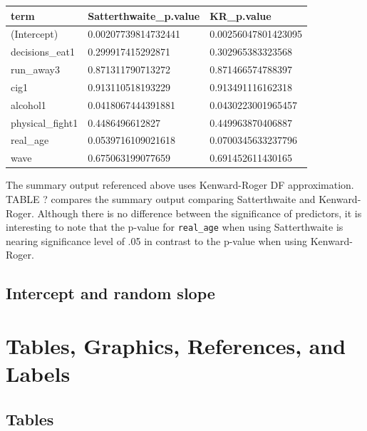 \documentclass[12pt, twoside]{amherstthesis}
\begin{document}
\begin{tabular}{l|l|l}
\hline
term & Satterthwaite\_p.value & KR\_p.value\\
\hline
(Intercept) & 0.00207739814732441 & 0.00256047801423095\\
\hline
decisions\_eat1 & 0.299917415292871 & 0.302965383323568\\
\hline
run\_away3 & 0.871311790713272 & 0.871466574788397\\
\hline
cig1 & 0.913110518193229 & 0.913491116162318\\
\hline
alcohol1 & 0.0418067444391881 & 0.0430223001965457\\
\hline
physical\_fight1 & 0.4486496612827 & 0.449963870406887\\
\hline
real\_age & 0.0539716109021618 & 0.0700345633237796\\
\hline
wave & 0.675063199077659 & 0.691452611430165\\
\hline
\end{tabular}
The summary output referenced above uses Kenward-Roger DF approximation. TABLE ? compares the summary output comparing Satterthwaite and Kenward-Roger. Although there is no difference between the significance of predictors, it is interesting to note that the p-value for \texttt{real\_age} when using Satterthwaite is nearing significance level of .05 in contrast to the p-value when using Kenward-Roger.

\hypertarget{intercept-and-random-slope}{%
\section{Intercept and random slope}\label{intercept-and-random-slope}}

\hypertarget{ref-labels}{%
\chapter{Tables, Graphics, References, and Labels}\label{ref-labels}}

\hypertarget{tables}{%
\section{Tables}\label{tables}}
\end{document}
